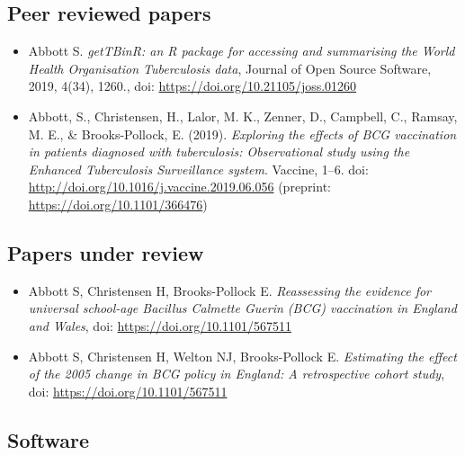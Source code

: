 \documentclass[11pt,twoside]{bristolthesis}
\begin{document}
  \hypertarget{peer-reviewed-papers}{%
  \subsection{Peer reviewed papers}\label{peer-reviewed-papers}}
  \begin{itemize}
  \item
    Abbott S. \emph{getTBinR: an R package for accessing and summarising the World Health Organisation Tuberculosis data},
    Journal of Open Source Software, 2019, 4(34), 1260., doi: \url{https://doi.org/10.21105/joss.01260}
  \item
    Abbott, S., Christensen, H., Lalor, M. K., Zenner, D., Campbell, C., Ramsay, M. E., \& Brooks-Pollock, E. (2019). \emph{Exploring the effects of BCG vaccination in patients diagnosed with tuberculosis: Observational study using the Enhanced Tuberculosis Surveillance system}. Vaccine, 1--6. doi: \url{http://doi.org/10.1016/j.vaccine.2019.06.056} (preprint: \url{https://doi.org/10.1101/366476})
  \end{itemize}
  \hypertarget{papers-under-review}{%
  \subsection{Papers under review}\label{papers-under-review}}
  \begin{itemize}
  \item
    Abbott S, Christensen H, Brooks-Pollock E. \emph{Reassessing the evidence for universal school-age Bacillus Calmette Guerin (BCG) vaccination in England and Wales}, doi: \url{https://doi.org/10.1101/567511}
  \item
    Abbott S, Christensen H, Welton NJ, Brooks-Pollock E. \emph{Estimating the effect of the 2005 change in BCG policy in England: A retrospective cohort study}, doi: \url{https://doi.org/10.1101/567511}
  \end{itemize}
  \hypertarget{software}{%
  \subsection{Software}\label{software}}
  
\end{document}

